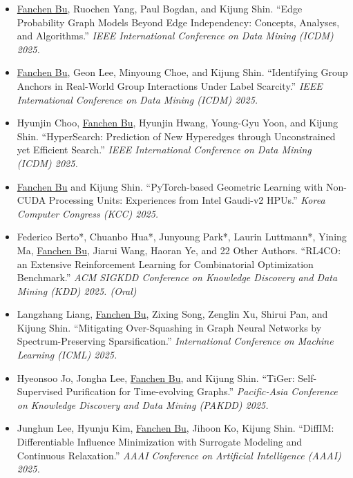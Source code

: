 \documentclass{resume}
\begin{document}
\begin{itemize}[parsep=0.5ex]
  \item [{[C20]}]
  \underline{Fanchen Bu}, Ruochen Yang, Paul Bogdan, and Kijung Shin.
  ``Edge Probability Graph Models Beyond Edge Independency: Concepts, Analyses, and Algorithms.''
  \textit{IEEE International Conference on Data Mining (ICDM) 2025.}

  \item [{[C19]}]
  \underline{Fanchen Bu}, Geon Lee, Minyoung Choe, and Kijung Shin.
  ``Identifying Group Anchors in Real-World Group Interactions Under Label Scarcity.''
  \textit{IEEE International Conference on Data Mining (ICDM) 2025.}

  \item [{[C18]}]
  Hyunjin Choo, \underline{Fanchen Bu}, Hyunjin Hwang, Young-Gyu Yoon, and Kijung Shin.
  ``HyperSearch: Prediction of New Hyperedges through Unconstrained yet Efficient Search.''
  \textit{IEEE International Conference on Data Mining (ICDM) 2025.}
  
  \item [{[C17]}]
  \underline{Fanchen Bu} and Kijung Shin.
  ``PyTorch-based Geometric Learning with Non-CUDA Processing Units: Experiences from Intel Gaudi-v2 HPUs.''
  \textit{Korea Computer Congress (KCC) 2025.}
  
  \item [{[C16]}]
  Federico Berto*, Chuanbo Hua*, Junyoung Park*, Laurin Luttmann*, Yining Ma, \underline{Fanchen Bu}, Jiarui Wang, Haoran Ye, and 22 Other Authors.
  ``RL4CO: an Extensive Reinforcement Learning for Combinatorial Optimization Benchmark.''
  \textit{ACM SIGKDD Conference on Knowledge Discovery and Data Mining (KDD) 2025. (Oral)}

  \item [{[C15]}]
  Langzhang Liang, \underline{Fanchen Bu}, Zixing Song, Zenglin Xu, Shirui Pan, and Kijung Shin.
  ``Mitigating Over-Squashing in Graph Neural Networks by Spectrum-Preserving Sparsification.''
  \textit{International Conference on Machine Learning (ICML) 2025.}
  
  \item [{[C14]}]
  Hyeonsoo Jo, Jongha Lee, \underline{Fanchen Bu}, and Kijung Shin.
  ``TiGer: Self-Supervised Purification for Time-evolving Graphs.''
  \textit{Pacific-Asia Conference on Knowledge Discovery and Data Mining (PAKDD) 2025.}

  \item [{[C13]}] 
  Junghun Lee, Hyunju Kim, \underline{Fanchen Bu}, Jihoon Ko, Kijung Shin.
  ``DiffIM: Differentiable Influence Minimization with Surrogate Modeling and Continuous Relaxation.''
  \textit{AAAI Conference on Artificial Intelligence (AAAI) 2025.}
  

\end{itemize}
\end{document}
